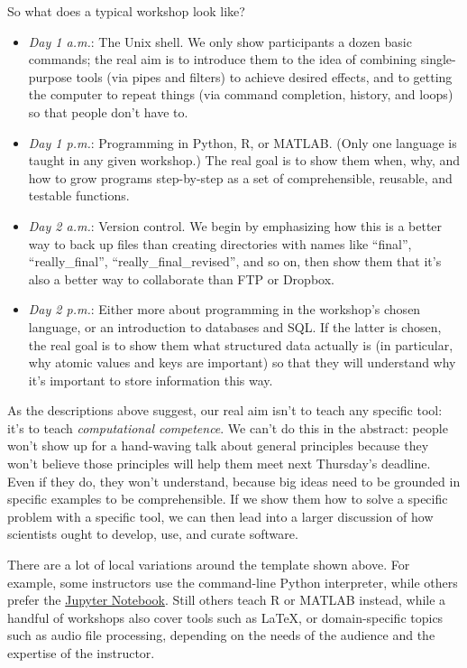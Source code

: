 \documentclass[10pt,a4paper,twocolumn]{article}
\begin{document}
So what does a typical workshop look like?

\begin{itemize}
\item
  \emph{Day 1 a.m.}: The Unix shell. We only show participants a dozen
  basic commands; the real aim is to introduce them to the idea of
  combining single-purpose tools (via pipes and filters) to achieve
  desired effects, and to getting the computer to repeat things (via
  command completion, history, and loops) so that people don't have
  to.
\item
  \emph{Day 1 p.m.}: Programming in Python, R, or MATLAB. (Only one
  language is taught in any given workshop.) The real goal is to show
  them when, why, and how to grow programs step-by-step as a set of
  comprehensible, reusable, and testable functions.
\item
  \emph{Day 2 a.m.}: Version control. We begin by emphasizing how this
  is a better way to back up files than creating directories with names
  like ``final'', ``really\_final'', ``really\_final\_revised'', and
  so on, then show them that it's also a better way to collaborate
  than FTP or Dropbox.
\item
  \emph{Day 2 p.m.}: Either more about programming in the workshop's
  chosen language, or an introduction to databases and SQL.  If the
  latter is chosen, the real goal is to show them what structured data
  actually is (in particular, why atomic values and keys are
  important) so that they will understand why it's important to store
  information this way.
\end{itemize}

As the descriptions above suggest, our real aim isn't to teach any
specific tool: it's to teach \emph{computational competence}. We can't
do this in the abstract: people won't show up for a hand-waving talk
about general principles because they won't believe those principles
will help them meet next Thursday's deadline.  Even if they do, they
won't understand, because big ideas need to be grounded in specific
examples to be comprehensible. If we show them how to solve a specific
problem with a specific tool, we can then lead into a larger
discussion of how scientists ought to develop, use, and curate
software.

There are a lot of local variations around the template shown above.
For example, some instructors use the command-line Python interpreter,
while others prefer the \href{https://jupyter.org/}{Jupyter Notebook}.
Still others teach R or MATLAB instead, while a handful of workshops
also cover tools such as LaTeX, or domain-specific topics such as
audio file processing, depending on the needs of the audience and the
expertise of the instructor.
\end{document}
